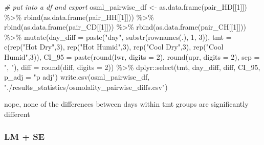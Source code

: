 \documentclass[
]{article}
\newenvironment{Shaded}{\begin{snugshade}}{\end{snugshade}}
\newcommand{\AttributeTok}[1]{\textcolor[rgb]{0.77,0.63,0.00}{#1}}
\newcommand{\CommentTok}[1]{\textcolor[rgb]{0.56,0.35,0.01}{\textit{#1}}}
\newcommand{\DecValTok}[1]{\textcolor[rgb]{0.00,0.00,0.81}{#1}}
\newcommand{\FunctionTok}[1]{\textcolor[rgb]{0.00,0.00,0.00}{#1}}
\newcommand{\NormalTok}[1]{#1}
\newcommand{\OtherTok}[1]{\textcolor[rgb]{0.56,0.35,0.01}{#1}}
\newcommand{\SpecialCharTok}[1]{\textcolor[rgb]{0.00,0.00,0.00}{#1}}
\newcommand{\StringTok}[1]{\textcolor[rgb]{0.31,0.60,0.02}{#1}}
\begin{document}
\begin{Shaded}
\begin{Highlighting}[]
\CommentTok{\# put into a df and export}
\NormalTok{osml\_pairwise\_df }\OtherTok{\textless{}{-}} \FunctionTok{as.data.frame}\NormalTok{(pair\_HD[[}\DecValTok{1}\NormalTok{]]) }\SpecialCharTok{\%\textgreater{}\%}
  \FunctionTok{rbind}\NormalTok{(}\FunctionTok{as.data.frame}\NormalTok{(pair\_HH[[}\DecValTok{1}\NormalTok{]])) }\SpecialCharTok{\%\textgreater{}\%}
  \FunctionTok{rbind}\NormalTok{(}\FunctionTok{as.data.frame}\NormalTok{(pair\_CD[[}\DecValTok{1}\NormalTok{]])) }\SpecialCharTok{\%\textgreater{}\%}
  \FunctionTok{rbind}\NormalTok{(}\FunctionTok{as.data.frame}\NormalTok{(pair\_CH[[}\DecValTok{1}\NormalTok{]])) }\SpecialCharTok{\%\textgreater{}\%}
  \FunctionTok{mutate}\NormalTok{(}\AttributeTok{day\_diff =} \FunctionTok{paste}\NormalTok{(}\StringTok{"day"}\NormalTok{, }\FunctionTok{substr}\NormalTok{(}\FunctionTok{rownames}\NormalTok{(.), }\DecValTok{1}\NormalTok{, }\DecValTok{3}\NormalTok{)),}
         \AttributeTok{tmt =} \FunctionTok{c}\NormalTok{(}\FunctionTok{rep}\NormalTok{(}\StringTok{"Hot Dry"}\NormalTok{,}\DecValTok{3}\NormalTok{),}
                 \FunctionTok{rep}\NormalTok{(}\StringTok{"Hot Humid"}\NormalTok{,}\DecValTok{3}\NormalTok{),}
                 \FunctionTok{rep}\NormalTok{(}\StringTok{"Cool Dry"}\NormalTok{,}\DecValTok{3}\NormalTok{),}
                 \FunctionTok{rep}\NormalTok{(}\StringTok{"Cool Humid"}\NormalTok{,}\DecValTok{3}\NormalTok{)),}
         \AttributeTok{CI\_95 =} \FunctionTok{paste}\NormalTok{(}\FunctionTok{round}\NormalTok{(lwr, }\AttributeTok{digits =} \DecValTok{2}\NormalTok{), }\FunctionTok{round}\NormalTok{(upr, }\AttributeTok{digits =} \DecValTok{2}\NormalTok{), }\AttributeTok{sep =} \StringTok{", "}\NormalTok{),}
         \AttributeTok{diff =} \FunctionTok{round}\NormalTok{(diff, }\AttributeTok{digits =} \DecValTok{2}\NormalTok{)) }\SpecialCharTok{\%\textgreater{}\%}
\NormalTok{  dplyr}\SpecialCharTok{::}\FunctionTok{select}\NormalTok{(tmt, day\_diff, diff, CI\_95, }\AttributeTok{p\_adj =} \StringTok{"p adj"}\NormalTok{)}
\FunctionTok{write.csv}\NormalTok{(osml\_pairwise\_df, }\StringTok{"./results\_statistics/osmolality\_pairwise\_diffs.csv"}\NormalTok{)}
\end{Highlighting}
\end{Shaded}

nope, none of the differences between days within tmt groups are
significantly different

\hypertarget{lm-se-1}{%
\subsubsection{LM + SE}\label{lm-se-1}}
\end{document}
